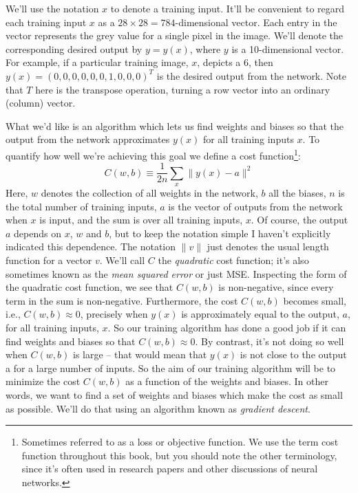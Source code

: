 \documentclass[a4paper,twoside,10pt]{book}
\begin{document}
We'll use the notation $x$ to denote a training input. It'll be convenient to regard each training input $x$ as a $28\times28=784$-dimensional vector. Each entry in the vector represents the grey value for a single pixel in the image. We'll denote the corresponding desired output by $y=y(x)$, where $y$ is a 10-dimensional vector. For example, if a particular training image, $x$, depicts a 6, then $y(x)=(0,0,0,0,0,0,1,0,0,0)^T$ is the desired output from the network. Note that $T$ here is the transpose operation, turning a row vector into an ordinary (column) vector.

What we'd like is an algorithm which lets us find weights and biases so that the output from the network approximates $y(x)$ for all training inputs $x$. To quantify how well we're achieving this goal we define a cost function\footnote{Sometimes referred to as a loss or objective function. We use the term cost function throughout this book, but you should note the other terminology, since it's often used in research papers and other discussions of neural networks.}:
\begin{equation}
	C(w,b) \equiv\frac1{2n}\sum_x\|y(x)-a\|^2
	\tag{6}\label{eq:6}
\end{equation}
Here, $w$ denotes the collection of all weights in the network, $b$ all the biases, $n$ is the total number of training inputs, $a$ is the vector of outputs from the network when $x$ is input, and the sum is over all training inputs, $x$. Of course, the output $a$ depends on $x$, $w$ and $b$, but to keep the notation simple I haven't explicitly indicated this dependence. The notation $\|v\|$ just denotes the usual length function for a vector $v$. We'll call $C$ the \textit{quadratic} cost function; it's also sometimes known as the \textit{mean squared error} or just MSE. Inspecting the form of the quadratic cost function, we see that $C(w,b)$ is non-negative, since every term in the sum is non-negative. Furthermore, the cost $C(w,b)$ becomes small, i.e., $C(w,b)\approx0$, precisely when $y(x)$ is approximately equal to the output, $a$, for all training inputs, $x$. So our training algorithm has done a good job if it can find weights and biases so that $C(w,b)\approx0$. By contrast, it's not doing so well when $C(w,b)$ is large -- that would mean that $y(x)$ is not close to the output a for a large number of inputs. So the aim of our training algorithm will be to minimize the cost $C(w,b)$ as a function of the weights and biases. In other words, we want to find a set of weights and biases which make the cost as small as possible. We'll do that using an algorithm known as \textit{gradient descent}.
\end{document}
